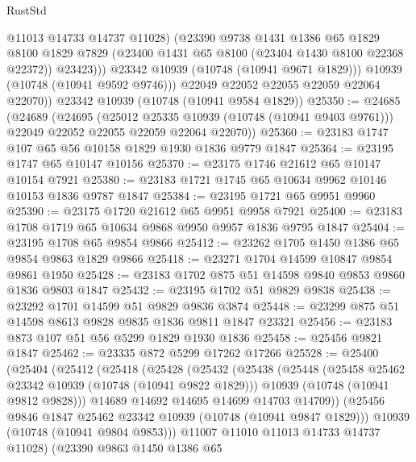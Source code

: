 \begin{lexlean}{RustStd}
\begin{coremodule}
{\begin{coremodule}
{{{{{                  @11013
                  @14733
                  @14737
                  @11028)
                (@23390
                  @9738
                  @1431
                  @1386
                  @65
                  @1829
                  @8100
                  @1829
                  @7829
                  (@23400 @1431 @65 @8100 (@23404 @1430 @8100 @22368 @22372))
                  @23423)))
            @23342
            @10939
            (@10748 (@10941 @9671 @1829)))
          @10939
          (@10748 (@10941 @9592 @9746)))
        @22049
        @22052
        @22055
        @22059
        @22064
        @22070))
    @23342
    @10939
    (@10748 (@10941 @9584 @1829))
@25350 := @24685
    (@24689
      (@24695
        (@25012 @25335 @10939 (@10748 (@10941 @9403 @9761)))
        @22049
        @22052
        @22055
        @22059
        @22064
        @22070))
@25360 := @23183 @1747 @107 @65 @56 @10158 @1829 @1930 @1836 @9779 @1847
@25364 := @23195 @1747 @65 @10147 @10156
@25370 := @23175 @1746 @21612 @65 @10147 @10154 @7921
@25380 := @23183 @1721 @1745 @65 @10634 @9962 @10146 @10153 @1836 @9787 @1847
@25384 := @23195 @1721 @65 @9951 @9960
@25390 := @23175 @1720 @21612 @65 @9951 @9958 @7921
@25400 := @23183 @1708 @1719 @65 @10634 @9868 @9950 @9957 @1836 @9795 @1847
@25404 := @23195 @1708 @65 @9854 @9866
@25412 := @23262 @1705 @1450 @1386 @65 @9854 @9863 @1829 @9866
@25418 := @23271 @1704 @14599 @10847 @9854 @9861 @1950
@25428 := @23183 @1702 @875 @51 @14598 @9840 @9853 @9860 @1836 @9803 @1847
@25432 := @23195 @1702 @51 @9829 @9838
@25438 := @23292 @1701 @14599 @51 @9829 @9836 @3874
@25448 := @23299 @875 @51 @14598 @8613 @9828 @9835 @1836 @9811 @1847 @23321
@25456 := @23183 @873 @107 @51 @56 @5299 @1829 @1930 @1836
@25458 := @25456 @9821 @1847
@25462 := @23335 @872 @5299 @17262 @17266
@25528 := @25400
    (@25404
      (@25412
        (@25418
          (@25428
            (@25432
              (@25438
                (@25448
                  (@25458 @25462 @23342 @10939 (@10748 (@10941 @9822 @1829)))
                  @10939
                  (@10748 (@10941 @9812 @9828)))
                @14689
                @14692
                @14695
                @14699
                @14703
                @14709))
            (@25456 @9846 @1847 @25462 @23342 @10939 (@10748 (@10941 @9847 @1829)))
            @10939
            (@10748 (@10941 @9804 @9853)))
          @11007
          @11010
          @11013
          @14733
          @14737
          @11028)
        (@23390
          @9863
          @1450
          @1386
          @65
}}}}}
\end{coremodule}}
\end{coremodule}
\end{lexlean}
